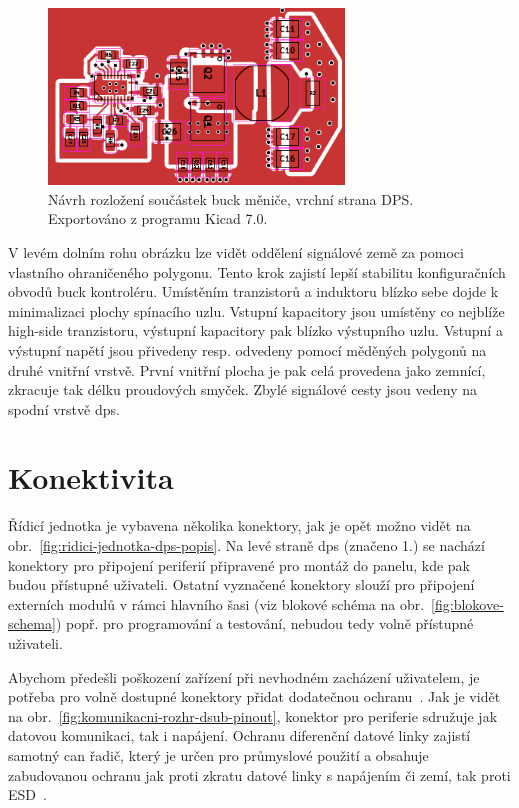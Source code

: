             \begin{figure}[h!]
                \centering
                \includegraphics[width=0.7\textwidth]{obrazky/exportovane/lm5148buck-edit.png}
                \caption{Návrh rozložení součástek buck měniče, vrchní strana DPS. Exportováno z programu Kicad 7.0.}
                \label{fig:lm5148buck-edit-png}
            \end{figure}
            
            V levém dolním rohu obrázku lze vidět oddělení signálové země za pomoci vlastního ohraničeného polygonu. Tento krok zajistí lepší stabilitu konfiguračních obvodů buck kontroléru. Umístěním tranzistorů a induktoru blízko sebe dojde k minimalizaci plochy spínacího uzlu.
            Vstupní kapacitory jsou umístěny co nejblíže high-side tranzistoru, výstupní kapacitory pak blízko výstupního uzlu. Vstupní a výstupní napětí jsou přivedeny resp. odvedeny pomocí měděných polygonů na druhé vnitřní vrstvě. První vnitřní plocha je pak celá provedena jako zemnící, zkracuje tak délku proudových smyček. Zbylé signálové cesty jsou vedeny na spodní vrstvě \acs{dps}.

    \section{Konektivita}
        Řídicí jednotka je vybavena několika konektory, jak je opět možno vidět na obr.~\ref{fig:ridici-jednotka-dps-popis}. Na levé straně \acs{dps} (značeno 1.) se nachází konektory pro připojení periferií připravené pro montáž do panelu, kde pak budou přístupné uživateli. Ostatní vyznačené konektory slouží pro připojení externích modulů v rámci hlavního šasi (viz blokové schéma na obr.~\ref{fig:blokove-schema}) popř. pro programování a testování, nebudou tedy volně přístupné uživateli.

        Abychom předešli poškození zařízení při nevhodném zacházení uživatelem, je potřeba pro volně dostupné konektory přidat dodatečnou ochranu~\cite{altium-circuit-protection}. Jak je vidět na obr.~\ref{fig:komunikacni-rozhr-dsub-pinout}, konektor pro periferie sdružuje jak datovou komunikaci, tak i napájení. Ochranu diferenční datové linky zajistí samotný \acs{can} řadič, který je určen pro průmyslové použití a obsahuje zabudovanou ochranu jak proti zkratu datové linky s napájením či zemí, tak proti ESD~\cite{ata-datasheet}. 

